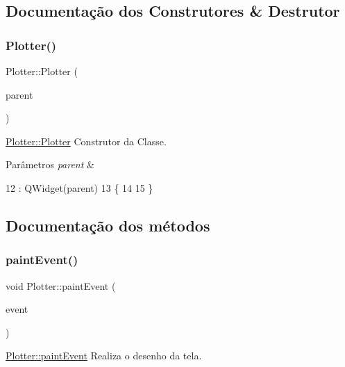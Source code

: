 \subsection{Documentação dos Construtores \& Destrutor}
\mbox{\label{class_plotter_a9d8f6981cf177bc3e843465d2b3425e9}} 
\subsubsection{\texorpdfstring{Plotter()}{Plotter()}}
{\footnotesize\ttfamily Plotter\+::\+Plotter (\begin{DoxyParamCaption}\item[{Q\+Widget $\ast$}]{parent }\end{DoxyParamCaption})}



\hyperlink{class_plotter_a9d8f6981cf177bc3e843465d2b3425e9}{Plotter\+::\+Plotter} Construtor da Classe. 


\begin{DoxyParams}{Parâmetros}
{\em parent} & \\
\hline
\end{DoxyParams}

\begin{DoxyCode}
12                                 : QWidget(parent)
13 \{
14 
15 \}
\end{DoxyCode}


\subsection{Documentação dos métodos}
\mbox{\label{class_plotter_a06477bf987646f000a8982db1352a11d}} 
\subsubsection{\texorpdfstring{paint\+Event()}{paintEvent()}}
{\footnotesize\ttfamily void Plotter\+::paint\+Event (\begin{DoxyParamCaption}\item[{Q\+Paint\+Event $\ast$}]{event }\end{DoxyParamCaption})}



\hyperlink{class_plotter_a06477bf987646f000a8982db1352a11d}{Plotter\+::paint\+Event} Realiza o desenho da tela. 



